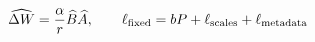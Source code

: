 \documentclass[border=3pt]{standalone}
\begin{document}
\color{ink}\fontsize{23}{28}\selectfont
$\displaystyle \widehat{\Delta W}=\frac{\alpha}{r}\widehat B\widehat A,\qquad \ell_{\rm fixed}=bP+\ell_{\rm scales}+\ell_{\rm metadata}$
\end{document}
